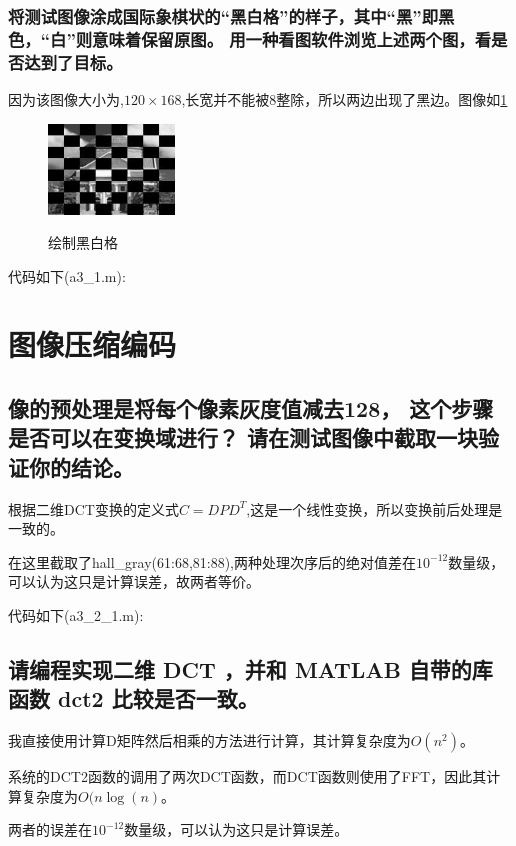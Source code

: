 \documentclass{ctexart}
\begin{document}
\subsubsection{将测试图像涂成国际象棋状的“黑白格”的样子，其中“黑”即黑色，“白”则意味着保留原图。 用一种看图软件浏览上述两个图，看是否达到了目标。}
因为该图像大小为,$120\times 168$,长宽并不能被8整除，所以两边出现了黑边。图像如\ref{1board}
\begin{figure}
    \centering
    \includegraphics[width=0.3\textwidth]{board.jpg}\\
    \caption{绘制黑白格\label{1board}}
\end{figure}

代码如下(a3\_1.m):


\section{图像压缩编码}
\subsection{
像的预处理是将每个像素灰度值减去128，
这个步骤是否可以在变换域进行？
请在测试图像中截取一块验证你的结论。}
根据二维DCT变换的定义式$C=DPD^T$,这是一个线性变换，所以变换前后处理是一致的。

在这里截取了hall\_gray(61:68,81:88),两种处理次序后的绝对值差在$10^{-12}$数量级，可以认为这只是计算误差，故两者等价。

代码如下(a3\_2\_1.m):


\subsection{
请编程实现二维 DCT ，并和 MATLAB 自带的库函数 dct2 比较是否一致。}
我直接使用计算D矩阵然后相乘的方法进行计算，其计算复杂度为$O(n^2)$。

系统的DCT2函数的调用了两次DCT函数，而DCT函数则使用了FFT，因此其计算复杂度为$O(n\log (n)$。

两者的误差在$10^{-12}$数量级，可以认为这只是计算误差。
\end{document}
